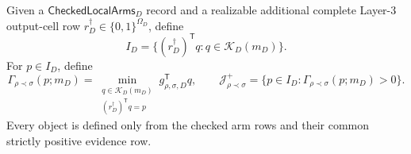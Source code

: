 Given a \(\mathsf{CheckedLocalArms}_D\) record and a realizable additional complete Layer-3 output-cell row \(r_D^\dagger\in\{0,1\}^{\Omega_D}\), define
\[
I_D=\{(r_D^\dagger)^{\mathsf T}q:q\in\mathcal K_D(m_D)\}.
\]
For \(p\in I_D\), define
\[
\Gamma_{\rho\prec\sigma}(p;m_D)
=\min_{\substack{q\in\mathcal K_D(m_D)\\
(r_D^\dagger)^{\mathsf T}q=p}}
g_{\rho,\sigma,D}^{\mathsf T}q,
\qquad
\mathcal J_{\rho\prec\sigma}^+
=\{p\in I_D:\Gamma_{\rho\prec\sigma}(p;m_D)>0\}.
\]
Every object is defined only from the checked arm rows and their common strictly positive evidence row.